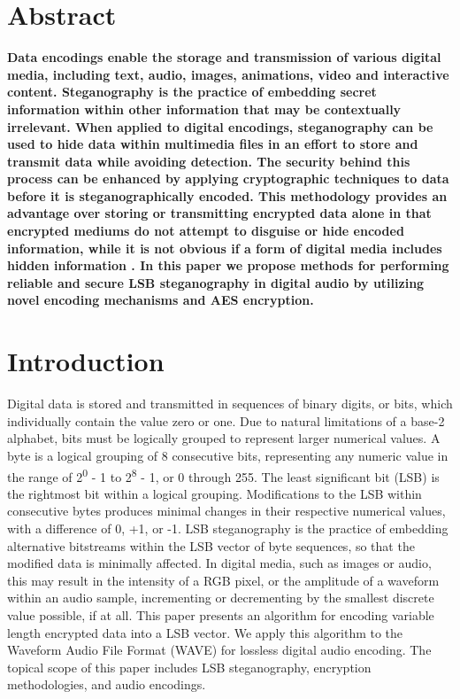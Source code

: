 \section*{Abstract}
\textbf{
Data encodings enable the storage and transmission of various digital media, including text, audio, images, animations, video and interactive content. Steganography is the practice of embedding secret information within other information that may be contextually irrelevant. When applied to digital encodings, steganography can be used to hide data within multimedia files in an effort to store and transmit data while avoiding detection. The security behind this process can be enhanced by applying cryptographic techniques to data before it is steganographically encoded. This methodology provides an advantage over storing or transmitting encrypted data alone in that encrypted mediums do not attempt to disguise or hide encoded information, while it is not obvious if a form of digital media includes hidden information \cite{paper8}. In this paper we propose methods for performing reliable and secure LSB steganography in digital audio by utilizing novel encoding mechanisms and AES encryption.}


\section{Introduction}
Digital data is stored and transmitted in sequences of binary digits, or bits, which individually contain the value zero or one. Due to natural limitations of a base-2 alphabet, bits must be logically grouped to represent larger numerical values. A byte is a logical grouping of 8 consecutive bits, representing any numeric value in the range of 2\textsuperscript{0} - 1 to 2\textsuperscript{8} - 1, or 0 through 255. The least significant bit (LSB) is the rightmost bit within a logical grouping. Modifications to the LSB within consecutive bytes produces minimal changes in their respective numerical values, with a difference of 0, +1, or -1.
LSB steganography is the practice of embedding alternative bitstreams within the LSB vector of byte sequences, so that the modified data is minimally affected. In digital media, such as images or audio, this may result in the intensity of a RGB pixel, or the amplitude of a waveform within an audio sample, incrementing or decrementing by the smallest discrete value possible, if at all. This paper presents an algorithm for encoding variable length encrypted data into a LSB vector. We apply this algorithm to the Waveform Audio File Format (WAVE) for lossless digital audio encoding. The topical scope of this paper includes LSB steganography, encryption methodologies, and audio encodings.

